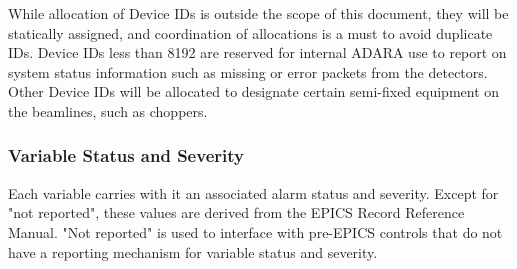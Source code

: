 While allocation of Device IDs is outside the scope of this document, they
will be statically assigned, and coordination of allocations is a must
to avoid duplicate IDs. Device IDs less than 8192 are reserved for
internal ADARA use to report on system status information such as missing
or error packets from the detectors. Other Device IDs will be allocated
to designate certain semi-fixed equipment on the beamlines, such as
choppers.


\newpage
\subsubsection{Variable Status and Severity}

Each variable carries with it an associated alarm status and severity.  Except
for "not reported", these values are derived from the EPICS Record Reference
Manual. "Not reported" is used to interface with pre-EPICS controls that
do not have a reporting mechanism for variable status and severity.


